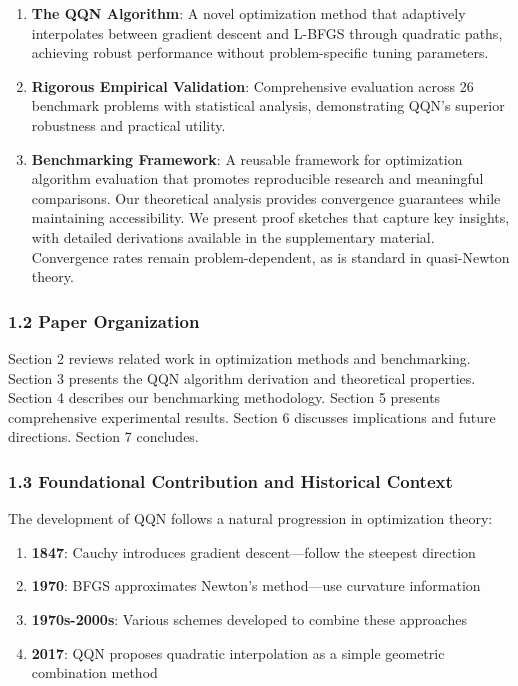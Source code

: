 \begin{enumerate}
\def\labelenumi{\arabic{enumi}.}
\item
  \textbf{The QQN Algorithm}: A novel optimization method that adaptively interpolates between gradient descent and L-BFGS
  through quadratic paths, achieving robust performance without problem-specific tuning parameters.
\item
  \textbf{Rigorous Empirical Validation}: Comprehensive evaluation across 26 benchmark problems with statistical analysis,
  demonstrating QQN's superior robustness and practical utility.
\item
  \textbf{Benchmarking Framework}: A reusable framework for optimization algorithm evaluation that promotes reproducible
  research and meaningful comparisons.
  Our theoretical analysis provides convergence guarantees while maintaining accessibility. We present proof sketches
  that capture key insights, with detailed derivations available in the supplementary material. Convergence rates
  remain problem-dependent, as is standard in quasi-Newton theory.
\end{enumerate}

\hypertarget{paper-organization}{%
\subsubsection{1.2 Paper Organization}\label{paper-organization}}

Section 2 reviews related work in optimization methods and benchmarking. Section 3 presents the QQN algorithm derivation
and theoretical properties. Section 4 describes our benchmarking methodology. Section 5 presents comprehensive
experimental results. Section 6 discusses implications and future directions. Section 7 concludes.

\hypertarget{foundational-contribution-and-historical-context}{%
\subsubsection{1.3 Foundational Contribution and Historical Context}\label{foundational-contribution-and-historical-context}}

The development of QQN follows a natural progression in optimization theory:

\begin{enumerate}
\def\labelenumi{\arabic{enumi}.}
\tightlist
\item
  \textbf{1847}: Cauchy introduces gradient descent---follow the steepest direction
\item
  \textbf{1970}: BFGS approximates Newton's method---use curvature information
\item
  \textbf{1970s-2000s}: Various schemes developed to combine these approaches
\item
  \textbf{2017}: QQN proposes quadratic interpolation as a simple geometric combination method
\end{enumerate}

